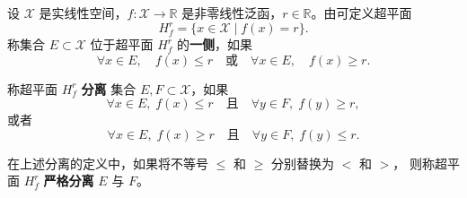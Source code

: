 \documentclass[../../main.tex]{subfiles}%
\begin{document}
\begin{definition}
设 $\mathscr{X}$ 是实线性空间，$f: \mathscr{X} \to \mathbb{R}$ 是非零线性泛函，$r \in \mathbb{R}$。由可定义超平面
\[
H_f^r = \{ x \in \mathscr{X} \mid f(x) = r \}.
\]
称集合 $E \subset \mathscr{X}$ 位于超平面 $H_f^r$ 的\textbf{一侧}，如果
\[
\forall x \in E,\quad f(x) \leqslant r \quad \text{或} \quad \forall x \in E,\quad f(x) \geqslant r.
\]

称超平面 $H_f^r$ \textbf{分离} 集合 $E, F \subset \mathscr{X}$，如果
\[
\forall x \in E,\; f(x) \leqslant r \quad \text{且} \quad \forall y \in F,\; f(y) \geqslant r,
\]
或者
\[
\forall x \in E,\; f(x) \geqslant r \quad \text{且} \quad \forall y \in F,\; f(y) \leqslant r.
\]

在上述分离的定义中，如果将不等号 $\le$ 和 $\ge$ 分别替换为 $<$ 和 $>$，
则称超平面 $H_f^r$ \textbf{严格分离} $E$ 与 $F$。
\end{definition}
\end{document}
